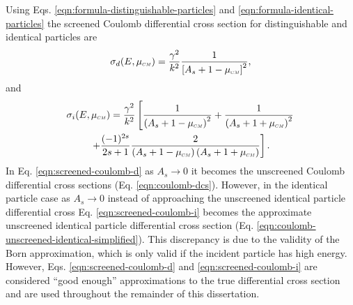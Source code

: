 Using Eqs. \eqref{eqn:formula-distinguishable-particles} and \eqref{eqn:formula-identical-particles} the screened Coulomb differential cross section for distinguishable and identical particles are
\begin{equation} \label{eqn:screened-coulomb-d}
    \sigma_{d}(E,\mucm) = \dfrac{\gamma^2}{k^2} \dfrac{1}{\left[A_s + 1 - \mucm\right]^2},
\end{equation}
and
\begin{multline} \label{eqn:screened-coulomb-i}
    \sigma_{i}(E,\mucm) = \dfrac{\gamma^2}{k^2} \left[ \dfrac{1}{\left(A_s + 1 - \mucm\right)^2} + \dfrac{1}{\left(A_s + 1 + \mucm\right)^2} \right. \\ \left. + \dfrac{(-1)^{2s}}{2s+1} \dfrac{2}{\left(A_s + 1 - \mucm\right)\left(A_s + 1 + \mucm\right) }\right].
\end{multline}
In Eq. \eqref{eqn:screened-coulomb-d} as $A_s \rightarrow 0$ it becomes the unscreened Coulomb differential cross sections (Eq. \eqref{eqn:coulomb-dcs}). However, in the identical particle case as $A_s \rightarrow 0$ instead of approaching the unscreened identical particle differential cross Eq. \eqref{eqn:screened-coulomb-i} becomes the approximate unscreened identical particle differential cross section (Eq. \eqref{eqn:coulomb-unscreened-identical-simplified}). This discrepancy is due to the validity of the Born approximation, which is only valid if the incident particle has high energy. However, Eqs. \eqref{eqn:screened-coulomb-d} and \eqref{eqn:screened-coulomb-i} are considered ``good enough'' approximations to the true differential cross section and are used throughout the remainder of this dissertation. 


